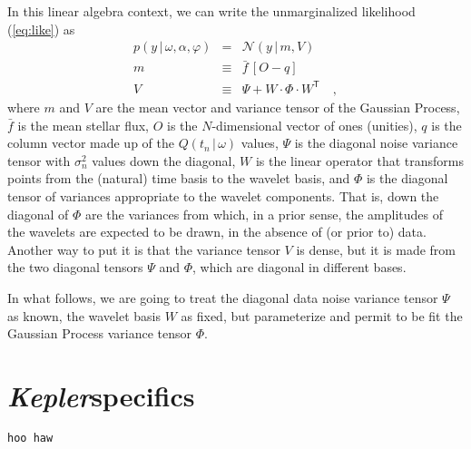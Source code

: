 \documentclass[12pt,letterpaper]{article}
\newcommand{\warning}[1]{\texttt{#1}}
\newcommand{\project}[1]{\textsl{#1}}
\newcommand{\Kepler}{\project{Kepler}}
\newcommand{\given}{\,|\,}
\newcommand{\transpose}[1]{{#1}^{\mathsf{T}}}
\newcommand{\datavec}{y}
\newcommand{\exofn}{Q}
\newcommand{\exovec}{q}
\newcommand{\exopars}{\omega}
\newcommand{\meanflux}{\bar{f}}
\newcommand{\starpars}{\alpha}
\newcommand{\variance}{\sigma^2}
\newcommand{\hyperpars}{\varphi}
\newcommand{\normal}{{\mathcal N}}
\newcommand{\meanvec}{m}
\newcommand{\noisetensor}{\Psi}
\newcommand{\wavetensor}{\Phi}
\newcommand{\weightmatrix}{W}
\newcommand{\vartensor}{V}
\newcommand{\onevec}{O}
\begin{document}
In this linear algebra context, we can write the unmarginalized likelihood (\ref{eq:like}) as
\begin{eqnarray}
p(\datavec\given\exopars,\starpars,\hyperpars)
  &=& \normal(\datavec\given\meanvec,\vartensor)
\\
\meanvec
  &\equiv& \meanflux\,[\onevec - \exovec]
\\
\vartensor
  &\equiv& \noisetensor + \weightmatrix\cdot\wavetensor\cdot\transpose{\weightmatrix}
\quad ,
\end{eqnarray}
where
$\meanvec$ and $\vartensor$ are the mean vector and variance tensor of the Gaussian Process,
$\meanflux$ is the mean stellar flux,
$\onevec$ is the $N$-dimensional vector of ones (unities),
$\exovec$ is the column vector made up of the $\exofn(t_n\given\exopars)$ values,
$\noisetensor$ is the diagonal noise variance tensor with $\variance_n$ values down the diagonal,
$\weightmatrix$ is the linear operator that transforms points
from the (natural) time basis to the wavelet basis,
and $\wavetensor$ is the diagonal tensor of variances appropriate to the wavelet components.
That is, down the diagonal of $\wavetensor$ are the variances from which,
in a prior sense,
the amplitudes of the wavelets are expected to be drawn,
in the absence of (or prior to) data.
Another way to put it is that the variance tensor $\vartensor$ is dense,
but it is made from the two diagonal tensors $\noisetensor$ and $\wavetensor$,
which are diagonal in different bases.

In what follows,
we are going to treat the diagonal data noise variance tensor $\noisetensor$ as known,
the wavelet basis $\weightmatrix$ as fixed,
but parameterize and permit to be fit the Gaussian Process variance tensor $\wavetensor$.

\section{\Kepler specifics}

\warning{hoo haw}
\end{document}
